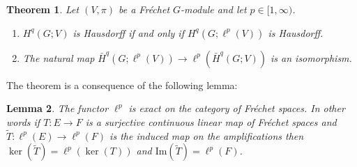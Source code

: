 \documentclass[12pt,reqno]{amsart}
\newtheorem{theorem}{Theorem}[section]
\newtheorem{lemma}[theorem]{Lemma}
\theoremstyle{definition}
\begin{document}
\begin{theorem}\label{thm:cohom of amplif}
    Let $(V,\pi)$ be a Fr\'echet $G$-module and let $p \in [1, \infty)$.
    \begin{enumerate}
        \item $H^q(G;V)$ is Hausdorff if and only if $H^q(G;\ell^p(V))$ is Hausdorff.
        \item The natural map $\bar{H}^q(G;\ell^p(V)) \to \ell^p(\bar{H}^q(G;V))$ is an isomorphism.
    \end{enumerate}
\end{theorem}
The theorem is a consequence of the following lemma:

\begin{lemma}
    The functor $\ell^p$ is exact on the category of Fr\'echet spaces. In other words if $T\colon E \to F$ is a surjective continuous linear map of Fr\'echet spaces and $\tilde{T}\colon\ell^p(E) \to \ell^p(F)$ is the induced map on the amplifications then $\ker(\tilde{T}) = \ell^p(\ker(T))$ and $\mathrm{Im}(\tilde{T}) = \ell^p(F)$.
\end{lemma}
\end{document}
